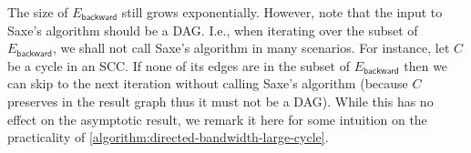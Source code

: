 \begin{remark}
    The size of $E_{\mathsf{backward}}$ still grows exponentially.
    However, note that the input to Saxe's algorithm should be a DAG.
    I.e., when iterating over the subset of $E_{\mathsf{backward}}$, we shall not call Saxe's algorithm in many scenarios.
    For instance, let $C$ be a cycle in an SCC.
    If none of its edges are in the subset of $E_{\mathsf{backward}}$ then we can skip to the next iteration without calling Saxe's algorithm (because $C$ preserves in the result graph thus it must not be a DAG).
    While this has no effect on the asymptotic result, we remark it here for some intuition on the practicality of \cref{algorithm:directed-bandwidth-large-cycle}.
\end{remark}